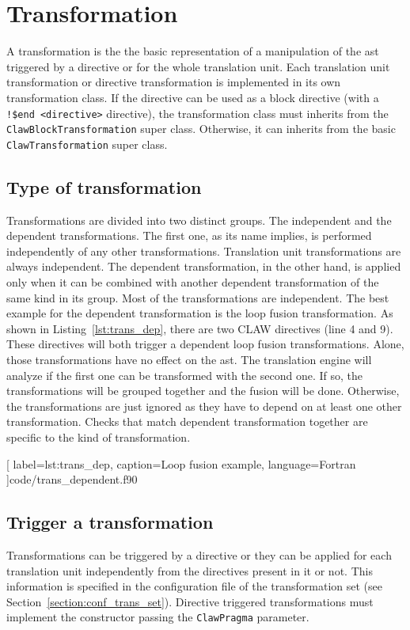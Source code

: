 \chapter{Transformation}
\label{chapter:transformation}
A transformation is the the basic representation of a manipulation of the
\gls{ast} triggered by a directive or for the whole translation unit. Each
translation unit transformation or directive transformation is implemented in
its own transformation class. If the directive can be used as a block directive
(with a \lstinline|!$end <directive>| directive), the transformation class must
inherits from the \lstinline!ClawBlockTransformation! super class. Otherwise,
it can inherits from the basic \lstinline!ClawTransformation! super class.

\section{Type of transformation}
\label{section:trans_type}
Transformations are divided into two distinct groups. The independent and the
dependent transformations. The first one, as its name implies, is performed
independently of any other transformations. Translation unit transformations
are always independent.
The dependent transformation, in the
other hand, is applied only when it can be combined with another dependent
transformation of the same kind in its group. Most of the transformations are
independent. The best example for the dependent transformation is the loop
fusion transformation. As shown in Listing~\ref{lst:trans_dep}, there are two
CLAW directives (line 4 and 9). These directives will both trigger a dependent
loop fusion transformations. Alone, those transformations have no effect
on the \gls{ast}. The translation engine will analyze if the
first one can be transformed with the second one. If so, the transformations
will be grouped together and the fusion will be done. Otherwise, the
transformations are just ignored as they have to depend on at least one other
transformation. Checks that match dependent transformation together are
specific to the kind of transformation.


  [
    label=lst:trans_dep,
    caption=Loop fusion example,
    language=Fortran
  ]{code/trans_dependent.f90}

\section{Trigger a transformation}
\label{section:trans_trigger}
Transformations can be triggered by a directive or they can be applied for each
translation unit independently from the directives present in it or not.
This information is specified in the configuration file of the transformation
set (see Section~\ref{section:conf_trans_set}). Directive triggered
transformations must implement the constructor passing the
\lstinline|ClawPragma| parameter.


